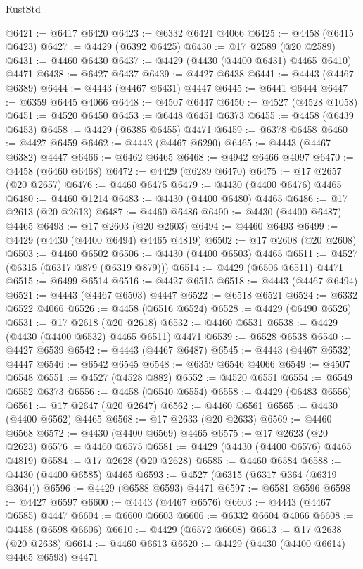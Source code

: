 \begin{lexlean}{RustStd}
\begin{coremodule}
{\begin{coremodule}
{{{{{{{{{{{{{{{{{{{{{{{{{{{{{{{{{{{{{{{{{{{{{{{{{{{{{{{{{{{{{{{{{{{{@6421 := @6417 @6420
@6423 := @6332 @6421 @4066
@6425 := @4458 (@6415 @6423)
@6427 := @4429 (@6392 @6425)
@6430 := @17 @2589 (@20 @2589)
@6431 := @4460 @6430
@6437 := @4429 (@4430 (@4400 @6431) @4465 @6410) @4471
@6438 := @6427 @6437
@6439 := @4427 @6438
@6441 := @4443 (@4467 @6389)
@6444 := @4443 (@4467 @6431) @4447
@6445 := @6441 @6444
@6447 := @6359 @6445 @4066
@6448 := @4507 @6447
@6450 := @4527 (@4528 @1058)
@6451 := @4520 @6450
@6453 := @6448 @6451 @6373
@6455 := @4458 (@6439 @6453)
@6458 := @4429 (@6385 @6455) @4471
@6459 := @6378 @6458
@6460 := @4427 @6459
@6462 := @4443 (@4467 @6290)
@6465 := @4443 (@4467 @6382) @4447
@6466 := @6462 @6465
@6468 := @4942 @6466 @4097
@6470 := @4458 (@6460 @6468)
@6472 := @4429 (@6289 @6470)
@6475 := @17 @2657 (@20 @2657)
@6476 := @4460 @6475
@6479 := @4430 (@4400 @6476) @4465
@6480 := @4460 @1214
@6483 := @4430 (@4400 @6480) @4465
@6486 := @17 @2613 (@20 @2613)
@6487 := @4460 @6486
@6490 := @4430 (@4400 @6487) @4465
@6493 := @17 @2603 (@20 @2603)
@6494 := @4460 @6493
@6499 := @4429 (@4430 (@4400 @6494) @4465 @4819)
@6502 := @17 @2608 (@20 @2608)
@6503 := @4460 @6502
@6506 := @4430 (@4400 @6503) @4465
@6511 := @4527 (@6315 (@6317 @879 (@6319 @879)))
@6514 := @4429 (@6506 @6511) @4471
@6515 := @6499 @6514
@6516 := @4427 @6515
@6518 := @4443 (@4467 @6494)
@6521 := @4443 (@4467 @6503) @4447
@6522 := @6518 @6521
@6524 := @6332 @6522 @4066
@6526 := @4458 (@6516 @6524)
@6528 := @4429 (@6490 @6526)
@6531 := @17 @2618 (@20 @2618)
@6532 := @4460 @6531
@6538 := @4429 (@4430 (@4400 @6532) @4465 @6511) @4471
@6539 := @6528 @6538
@6540 := @4427 @6539
@6542 := @4443 (@4467 @6487)
@6545 := @4443 (@4467 @6532) @4447
@6546 := @6542 @6545
@6548 := @6359 @6546 @4066
@6549 := @4507 @6548
@6551 := @4527 (@4528 @882)
@6552 := @4520 @6551
@6554 := @6549 @6552 @6373
@6556 := @4458 (@6540 @6554)
@6558 := @4429 (@6483 @6556)
@6561 := @17 @2647 (@20 @2647)
@6562 := @4460 @6561
@6565 := @4430 (@4400 @6562) @4465
@6568 := @17 @2633 (@20 @2633)
@6569 := @4460 @6568
@6572 := @4430 (@4400 @6569) @4465
@6575 := @17 @2623 (@20 @2623)
@6576 := @4460 @6575
@6581 := @4429 (@4430 (@4400 @6576) @4465 @4819)
@6584 := @17 @2628 (@20 @2628)
@6585 := @4460 @6584
@6588 := @4430 (@4400 @6585) @4465
@6593 := @4527 (@6315 (@6317 @364 (@6319 @364)))
@6596 := @4429 (@6588 @6593) @4471
@6597 := @6581 @6596
@6598 := @4427 @6597
@6600 := @4443 (@4467 @6576)
@6603 := @4443 (@4467 @6585) @4447
@6604 := @6600 @6603
@6606 := @6332 @6604 @4066
@6608 := @4458 (@6598 @6606)
@6610 := @4429 (@6572 @6608)
@6613 := @17 @2638 (@20 @2638)
@6614 := @4460 @6613
@6620 := @4429 (@4430 (@4400 @6614) @4465 @6593) @4471
}}}}}}}}}}}}}}}}}}}}}}}}}}}}}}}}}}}}}}}}}}}}}}}}}}}}}}}}}}}}}}}}}}}}
\end{coremodule}}
\end{coremodule}
\end{lexlean}
